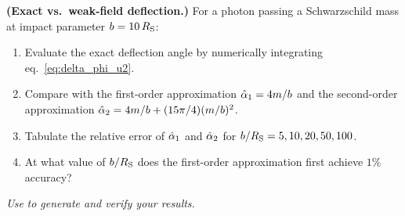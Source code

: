 \begin{exercise}
\label{ex:strong_field}
\textbf{(Exact vs.\ weak-field deflection.)}
For a photon passing a Schwarzschild mass at impact parameter $b = 10\,R_{\mathrm{S}}$:
\begin{enumerate}[label=(\alph*)]
    \item Evaluate the exact deflection angle by numerically integrating
          eq.~\eqref{eq:delta_phi_u2}.
    \item Compare with the first-order approximation
          $\hat{\alpha}_1 = 4m/b$ and the second-order approximation
          $\hat{\alpha}_2 = 4m/b + (15\pi/4)(m/b)^2$.
    \item Tabulate the relative error of $\hat{\alpha}_1$ and $\hat{\alpha}_2$
          for $b/R_{\mathrm{S}} = 5, 10, 20, 50, 100$.
    \item At what value of $b/R_{\mathrm{S}}$ does the first-order approximation
          first achieve $1\%$ accuracy?
\end{enumerate}
\textit{Use}
\textit{to generate and verify your results.}
\end{exercise}
